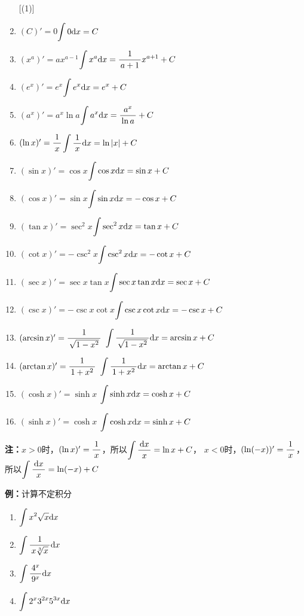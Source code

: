 \begin{thx}
	\begin{enumerate} [(1)]
	  \item $(C)'=0$\hfill  {$\dint 0\d x=C$} 
	  \item $(x^a)'=ax^{a-1}$\hfill  {$\dint x^a\d x=\df{1}{a+1}x^{a+1}+C$}
	  \item $(e^x)'=e^x$\hfill  {$\dint e^x\d x=e^x+C$} 
	  \item $(a^x)'=a^x\ln a$\hfill  {$\dint a^x\d x=\df{a^x}{\ln a}+C$}
	  \item $(\ln x)'=\df 1x$\hfill  {$\dint \df 1x\d x=\ln|x|+C$}
	  \item $(\sin x)'=\cos x$\hfill  {$\dint \cos x\d x=\sin x+C$} 
	  \item $(\cos x)'=\sin x$\hfill  {$\dint \sin x\d x=-\cos x+C$}
	  \item $(\tan x)'=\sec^2 x$\hfill  {$\dint \sec^2 x\d x=\tan x+C$} 
	  \item $(\cot x)'=-\csc^2 x$\hfill  {$\dint \csc^2 x\d x=-\cot x+C$}
	  \item $(\sec x)'=\sec x\tan x$\hfill $\dint\sec x\tan x\d x=\sec x+C$
	  \item $(\csc x)'=-\csc x\cot x$\hfill $\dint\csc x\cot x\d x=-\csc x+C$
	  \item $(\arcsin x)'=\df{1}{\sqrt{1-x^2}}$ \hfill  
	  {$\dint{\df{1}{\sqrt{1-x^2}}}\d x=\arcsin x+C$} 
	  \item $(\arctan x)'=\df{1}{1+x^2}$ \hfill 
	  {$\dint \df{1}{1+x^2}\d x=\arctan x+C$}
	  \item $(\cosh x)'=\sinh x$ \hfill $\dint\sinh x\d x=\cosh x+C$
	  \item $(\sinh x)'=\cosh x$ \hfill $\dint\cosh x\d x=\sinh x+C$
	\end{enumerate}
\end{thx}

{\bf 注：}$x>0$时，$(\ln x)'=\df 1x$，所以$\dint\df{\d x}x=\ln x+C$，
$x<0$时，$(\ln(-x))'=\df1x$，所以$\dint\df{\d x}x=\ln(-x)+C$

{\bf 例：}计算不定积分
\begin{enumerate}[(1)]
  \setlength{\itemindent}{1cm}
  \item $\dint x^2\sqrt{x}\d x$ 
  \item $\dint \df{1}{x\sqrt[3]{x}}\d x$ 
  \item $\dint \df{4^x}{9^x}\d x$ 
  \item $\dint 2^x3^{2x}5^{3x}\d x$
\end{enumerate}

